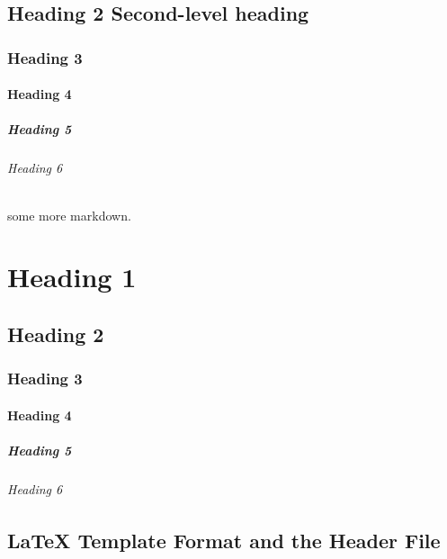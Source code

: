 \documentclass[english]{workpackage}[1996/06/02]
\begin{document}
\section{Heading 2 Second-level heading}
\label{sec:Heading2Secondlevelheading}


\subsection{Heading 3}
\label{sec:Heading3}


\subsubsection{Heading 4}
\label{sec:Heading4}


\paragraph{Heading 5}
\label{sec:Heading5}


\subparagraph{Heading 6}
\label{sec:Heading6}

some more markdown.



\chapter{Heading 1}
\label{sec:Heading1}


\section{Heading 2}
\label{sec:Heading2}


\subsection{Heading 3}
\label{sec:Heading3}


\subsubsection{Heading 4}
\label{sec:Heading4}


\paragraph{Heading 5}
\label{sec:Heading5}


\subparagraph{Heading 6}
\label{sec:Heading6}


\section{LaTeX Template Format and the Header File}
\label{sec:LaTeXTemplateFormatandtheHeaderFile}
\end{document}
